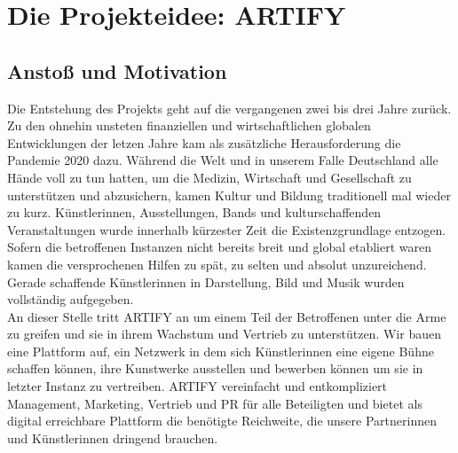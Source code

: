 \documentclass[11pt,a4paper]{report}
\begin{document}
\section{Die Projekteidee: ARTIFY}
\subsection{Anstoß und Motivation}
Die Entstehung des Projekts geht auf die vergangenen zwei bis drei Jahre zurück. Zu den ohnehin unsteten finanziellen und wirtschaftlichen globalen Entwicklungen der letzen Jahre kam als zusätzliche Herausforderung die Pandemie 2020 dazu. Während die Welt und in unserem Falle Deutschland alle Hände voll zu tun hatten, um die Medizin,  Wirtschaft und Gesellschaft zu unterstützen und abzusichern, kamen Kultur und Bildung traditionell mal wieder zu kurz. Künstlerinnen, Ausstellungen, Bands und kulturschaffenden Veranstaltungen wurde innerhalb kürzester Zeit die Existenzgrundlage entzogen. Sofern die betroffenen Instanzen nicht bereits breit und global etabliert waren kamen die versprochenen Hilfen zu spät, zu selten und absolut unzureichend. Gerade schaffende Künstlerinnen in Darstellung, Bild und Musik wurden vollständig aufgegeben. \\An dieser Stelle tritt ARTIFY an um einem Teil der Betroffenen unter die Arme zu greifen und sie in ihrem Wachstum und Vertrieb zu unterstützen. Wir bauen eine Plattform auf, ein Netzwerk in dem sich Künstlerinnen eine eigene Bühne schaffen können, ihre Kunstwerke ausstellen und bewerben können um sie in letzter Instanz zu vertreiben. ARTIFY vereinfacht und entkompliziert Management, Marketing, Vertrieb und PR für alle Beteiligten und bietet als digital erreichbare Plattform die benötigte Reichweite, die unsere Partnerinnen und Künstlerinnen dringend brauchen.
\end{document}
